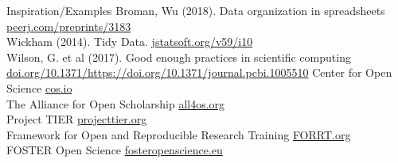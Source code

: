 \begin{block}{Inspiration/Examples}
Broman, Wu (2018). Data organization in spreadsheets \\ \href{https://peerj.com/preprints/3183/}{peerj.com/preprints/3183}
\\ Wickham (2014). Tidy Data. \href{http://www.jstatsoft.org/v59/i10/}{jstatsoft.org/v59/i10}
\\ Wilson, G. et al (2017). Good enough practices in scientific computing \href{https://doi.org/10.1371/journal.pcbi.1005510}{doi.org/10.1371/https://doi.org/10.1371/journal.pcbi.1005510}
 Center for Open Science \href{https://www.cos.io/}{cos.io}
\\ The Alliance for Open Scholarship \href{https://www.all4os.org/}{all4os.org}
\\ Project TIER \href{https://www.projecttier.org/}{projecttier.org}
\\ Framework for Open and Reproducible Research Training \href{https://forrt.org/glossary/transparency/}{FORRT.org}
\\ FOSTER Open Science \href{https://www.fosteropenscience.eu/}{fosteropenscience.eu}

\end{block}


